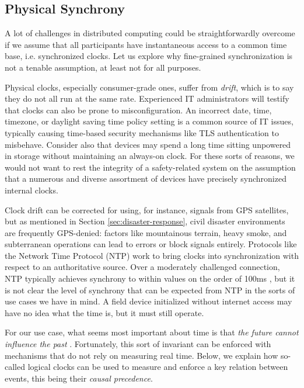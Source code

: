 \documentclass[]             %
{NASA}                       %
\theoremstyle{definition}
\begin{document}
\subsection{Physical Synchrony}
\label{ssec:physical-synchrony}
A lot of challenges in distributed computing could be
straightforwardly overcome if we assume that all participants have
instantaneous access to a common time base, i.e.  synchronized
clocks. Let us explore why fine-grained synchronization is not a
tenable assumption, at least not for all purposes.

Physical clocks, especially consumer-grade ones, suffer from
\emph{drift}, which is to say they do not all run at the same
rate. Experienced IT administrators will testify that clocks can also
be prone to misconfiguration. An incorrect date, time, timezone, or
daylight saving time policy setting is a common source of IT issues,
typically causing time-based security mechanisms like TLS
authentication \citationneeded to misbehave. Consider also that
devices may spend a long time sitting unpowered in storage without
maintaining an always-on clock. For these sorts of reasons, we would
not want to rest the integrity of a safety-related system on the
assumption that a numerous and diverse assortment of devices have
precisely synchronized internal clocks.

Clock drift can be corrected for using, for instance, signals from GPS
satellites, but as mentioned in Section \ref{sec:disaster-response},
civil disaster environments are frequently GPS-denied: factors like
mountainous terrain, heavy smoke, and subterranean operations can lead
to errors or block signals entirely. Protocols like the Network Time
Protocol (NTP) \cite{rfc1119} work to bring clocks into
synchronization with respect to an authoritative source. Over a
moderately challenged connection, NTP typically achieves synchrony to
within values on the order of 100ms \citationneeded, but it is not
clear the level of synchrony that can be expected from NTP in the
sorts of use cases we have in mind. A field device initialized without
internet access may have no idea what the time is, but it must still
operate.

For our use case, what seems most important about time is that
\emph{the future cannot influence the past}
\cite{1989mattern}. Fortunately, this sort of invariant can be
enforced with mechanisms that do not rely on measuring real
time. Below, we explain how so-called logical clocks can be used to
measure and enforce a key relation between events, this being their
\emph{causal precedence}.
\end{document}
